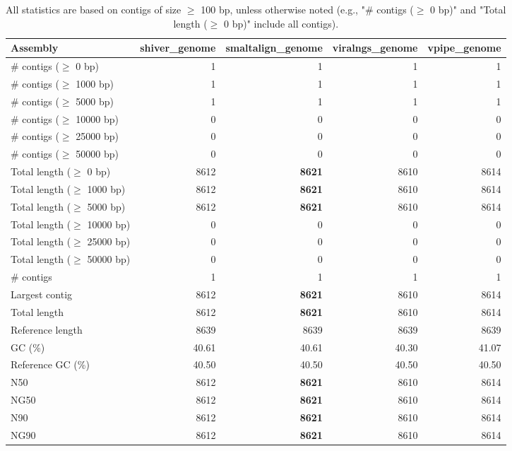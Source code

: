 \documentclass[12pt,a4paper]{article}
\begin{document}
\begin{table}[ht]
\begin{center}
\caption{All statistics are based on contigs of size $\geq$ 100 bp, unless otherwise noted (e.g., "\# contigs ($\geq$ 0 bp)" and "Total length ($\geq$ 0 bp)" include all contigs).}
\begin{tabular}{|l*{4}{|r}|}
\hline
Assembly & shiver\_genome & smaltalign\_genome & viralngs\_genome & vpipe\_genome \\ \hline
\# contigs ($\geq$ 0 bp) & 1 & 1 & 1 & 1 \\ \hline
\# contigs ($\geq$ 1000 bp) & 1 & 1 & 1 & 1 \\ \hline
\# contigs ($\geq$ 5000 bp) & 1 & 1 & 1 & 1 \\ \hline
\# contigs ($\geq$ 10000 bp) & 0 & 0 & 0 & 0 \\ \hline
\# contigs ($\geq$ 25000 bp) & 0 & 0 & 0 & 0 \\ \hline
\# contigs ($\geq$ 50000 bp) & 0 & 0 & 0 & 0 \\ \hline
Total length ($\geq$ 0 bp) & 8612 & {\bf 8621} & 8610 & 8614 \\ \hline
Total length ($\geq$ 1000 bp) & 8612 & {\bf 8621} & 8610 & 8614 \\ \hline
Total length ($\geq$ 5000 bp) & 8612 & {\bf 8621} & 8610 & 8614 \\ \hline
Total length ($\geq$ 10000 bp) & 0 & 0 & 0 & 0 \\ \hline
Total length ($\geq$ 25000 bp) & 0 & 0 & 0 & 0 \\ \hline
Total length ($\geq$ 50000 bp) & 0 & 0 & 0 & 0 \\ \hline
\# contigs & 1 & 1 & 1 & 1 \\ \hline
Largest contig & 8612 & {\bf 8621} & 8610 & 8614 \\ \hline
Total length & 8612 & {\bf 8621} & 8610 & 8614 \\ \hline
Reference length & 8639 & 8639 & 8639 & 8639 \\ \hline
GC (\%) & 40.61 & 40.61 & 40.30 & 41.07 \\ \hline
Reference GC (\%) & 40.50 & 40.50 & 40.50 & 40.50 \\ \hline
N50 & 8612 & {\bf 8621} & 8610 & 8614 \\ \hline
NG50 & 8612 & {\bf 8621} & 8610 & 8614 \\ \hline
N90 & 8612 & {\bf 8621} & 8610 & 8614 \\ \hline
NG90 & 8612 & {\bf 8621} & 8610 & 8614 \\ \hline

\end{tabular}
\end{center}
\end{table}
\end{document}
